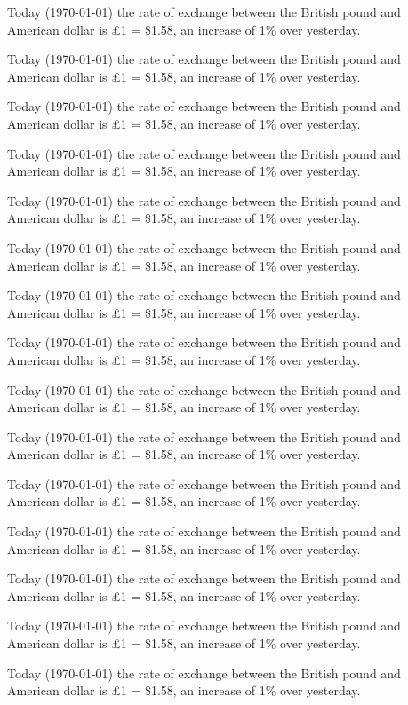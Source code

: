 \documentclass{article}
\begin{document}
\begin{multicols}{5}
Today (\today) the rate of exchange between the British
pound and American dollar is \pounds 1 = \$1.58, an
increase of 1\% over yesterday.

Today (\today) the rate of exchange between the British
pound and American dollar is \pounds 1 = \$1.58, an
increase of 1\% over yesterday.

Today (\today) the rate of exchange between the British
pound and American dollar is \pounds 1 = \$1.58, an
increase of 1\% over yesterday.

Today (\today) the rate of exchange between the British
pound and American dollar is \pounds 1 = \$1.58, an
increase of 1\% over yesterday.

Today (\today) the rate of exchange between the British
pound and American dollar is \pounds 1 = \$1.58, an
increase of 1\% over yesterday.

Today (\today) the rate of exchange between the British
pound and American dollar is \pounds 1 = \$1.58, an
increase of 1\% over yesterday.

Today (\today) the rate of exchange between the British
pound and American dollar is \pounds 1 = \$1.58, an
increase of 1\% over yesterday.

Today (\today) the rate of exchange between the British
pound and American dollar is \pounds 1 = \$1.58, an
increase of 1\% over yesterday.

Today (\today) the rate of exchange between the British
pound and American dollar is \pounds 1 = \$1.58, an
increase of 1\% over yesterday.

Today (\today) the rate of exchange between the British
pound and American dollar is \pounds 1 = \$1.58, an
increase of 1\% over yesterday.

Today (\today) the rate of exchange between the British
pound and American dollar is \pounds 1 = \$1.58, an
increase of 1\% over yesterday.

Today (\today) the rate of exchange between the British
pound and American dollar is \pounds 1 = \$1.58, an
increase of 1\% over yesterday.

Today (\today) the rate of exchange between the British
pound and American dollar is \pounds 1 = \$1.58, an
increase of 1\% over yesterday.

Today (\today) the rate of exchange between the British
pound and American dollar is \pounds 1 = \$1.58, an
increase of 1\% over yesterday.

Today (\today) the rate of exchange between the British
pound and American dollar is \pounds 1 = \$1.58, an
increase of 1\% over yesterday.


\end{multicols}
\end{document}
